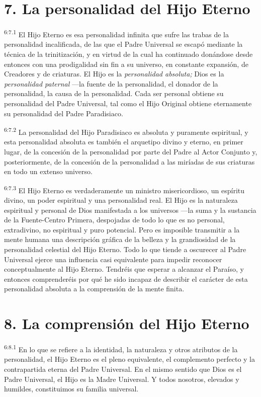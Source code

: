 \section*{7. La personalidad del Hijo Eterno}
\par
\textsuperscript{6:7.1} El Hijo Eterno es esa personalidad infinita que sufre las trabas de la personalidad incalificada, de las que el Padre Universal se escapó mediante la técnica de la trinitización, y en virtud de la cual ha continuado donándose desde entonces con una prodigalidad sin fin a su universo, en constante expansión, de Creadores y de criaturas. El Hijo es la \textit{personalidad absoluta;} Dios es la \textit{personalidad paternal} ---la fuente de la personalidad, el donador de la personalidad, la causa de la personalidad. Cada ser personal obtiene su personalidad del Padre Universal, tal como el Hijo Original obtiene eternamente su personalidad del Padre Paradisiaco.

\par
\textsuperscript{6:7.2} La personalidad del Hijo Paradisiaco es absoluta y puramente espiritual, y esta personalidad absoluta es también el arquetipo divino y eterno, en primer lugar, de la concesión de la personalidad por parte del Padre al Actor Conjunto y, posteriormente, de la concesión de la personalidad a las miríadas de sus criaturas en todo un extenso universo.

\par
\textsuperscript{6:7.3} El Hijo Eterno es verdaderamente un ministro misericordioso, un espíritu divino, un poder espiritual y una personalidad real. El Hijo es la naturaleza espiritual y personal de Dios manifestada a los universos ---la suma y la sustancia de la Fuente-Centro Primera, despojadas de todo lo que es no personal, extradivino, no espiritual y puro potencial. Pero es imposible transmitir a la mente humana una descripción gráfica de la belleza y la grandiosidad de la personalidad celestial del Hijo Eterno. Todo lo que tiende a oscurecer al Padre Universal ejerce una influencia casi equivalente para impedir reconocer conceptualmente al Hijo Eterno. Tendréis que esperar a alcanzar el Paraíso, y entonces comprenderéis por qué he sido incapaz de describir el carácter de esta personalidad absoluta a la comprensión de la mente finita.

\section*{8. La comprensión del Hijo Eterno}
\par
\textsuperscript{6:8.1} En lo que se refiere a la identidad, la naturaleza y otros atributos de la personalidad, el Hijo Eterno es el pleno equivalente, el complemento perfecto y la contrapartida eterna del Padre Universal. En el mismo sentido que Dios es el Padre Universal, el Hijo es la Madre Universal. Y todos nosotros, elevados y humildes, constituimos su familia universal.

